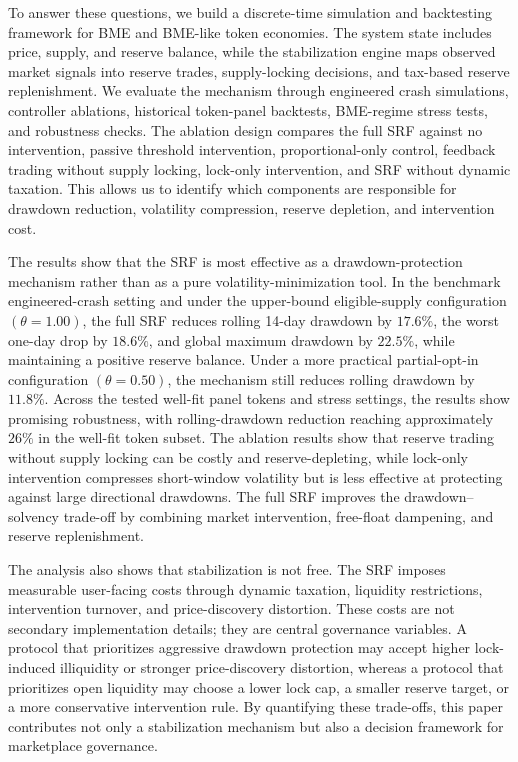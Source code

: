\documentclass[a4paper,fleqn]{cas-dc}
\begin{document}
To answer these questions, we build a discrete-time simulation and backtesting framework for BME and BME-like token economies. The system state includes price, supply, and reserve balance, while the stabilization engine maps observed market signals into reserve trades, supply-locking decisions, and tax-based reserve replenishment. We evaluate the mechanism through engineered crash simulations, controller ablations, historical token-panel backtests, BME-regime stress tests, and robustness checks. The ablation design compares the full SRF against no intervention, passive threshold intervention, proportional-only control, feedback trading without supply locking, lock-only intervention, and SRF without dynamic taxation. This allows us to identify which components are responsible for drawdown reduction, volatility compression, reserve depletion, and intervention cost.

The results show that the SRF is most effective as a drawdown-protection mechanism rather than as a pure volatility-minimization tool. In the benchmark engineered-crash setting and under the upper-bound eligible-supply configuration \((\theta=1.00)\), the full SRF reduces rolling 14-day drawdown by \(17.6\%\), the worst one-day drop by \(18.6\%\), and global maximum drawdown by \(22.5\%\), while maintaining a positive reserve balance. Under a more practical partial-opt-in configuration \((\theta=0.50)\), the mechanism still reduces rolling drawdown by \(11.8\%\). Across the tested well-fit panel tokens and stress settings, the results show promising robustness, with rolling-drawdown reduction reaching approximately \(26\%\) in the well-fit token subset. The ablation results show that reserve trading without supply locking can be costly and reserve-depleting, while lock-only intervention compresses short-window volatility but is less effective at protecting against large directional drawdowns. The full SRF improves the drawdown--solvency trade-off by combining market intervention, free-float dampening, and reserve replenishment.

The analysis also shows that stabilization is not free. The SRF imposes measurable user-facing costs through dynamic taxation, liquidity restrictions, intervention turnover, and price-discovery distortion. These costs are not secondary implementation details; they are central governance variables. A protocol that prioritizes aggressive drawdown protection may accept higher lock-induced illiquidity or stronger price-discovery distortion, whereas a protocol that prioritizes open liquidity may choose a lower lock cap, a smaller reserve target, or a more conservative intervention rule. By quantifying these trade-offs, this paper contributes not only a stabilization mechanism but also a decision framework for marketplace governance.
\end{document}
